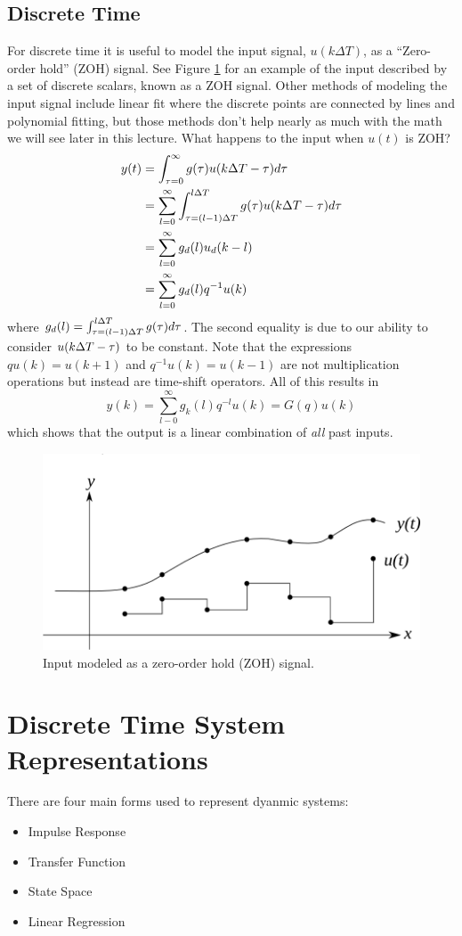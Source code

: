 \subsection{Discrete Time}
For discrete time it is useful to model the input signal, $u(k\Delta T)$, as a ``Zero-order hold'' (ZOH) signal. See Figure \ref{fig:03zoh} for an example of the input described by a set of discrete scalars, known as a ZOH signal. Other methods of modeling the input signal include linear fit where the discrete points are connected by lines and polynomial fitting, but those methods don't help nearly as much with the math we will see later in this lecture. What happens to the input when $u(t)$ is ZOH?
\begin{align*}
y(t) &= \int_{\tau=0}^\infty g(\tau)u(k\Delta T -\tau)d\tau \\
&= \sum_{l=0}^\infty \int_{\tau=(l-1)\Delta T}^{l\Delta T}g(\tau)u(k\Delta T -\tau)d\tau \\
&= \sum_{l=0}^\infty g_d(l)u_d(k-l) \\
&= \sum_{l=0}^\infty g_d(l)q^{-1}u(k)
\end{align*}
where $g_d(l)=\int_{\tau=(l-1)\Delta T}^{l\Delta T}g(\tau)d\tau$. The second equality is due to our ability to consider $u(k\Delta T -\tau)$ to be constant. Note that the expressions $qu(k) = u(k+1)$ and $q^{-1}u(k)=u(k-1)$ are not multiplication operations but instead are time-shift operators. All of this results in
$$y(k) = \sum_{l-0}^\infty g_k(l)q^{-l}u(k) = G(q)u(k)$$
which shows that the output is a linear combination of \textit{all} past inputs.
\begin{figure}[ht!]
	\centering
	\includegraphics[width=.5\textwidth]{images/03zoh}
	\caption{Input modeled as a zero-order hold (ZOH) signal.}
	\label{fig:03zoh}
\end{figure}

\section{Discrete Time System Representations}
There are four main forms used to represent dyanmic systems:
\begin{itemize}
\item Impulse Response
\item Transfer Function
\item State Space
\item Linear Regression
\end{itemize}

